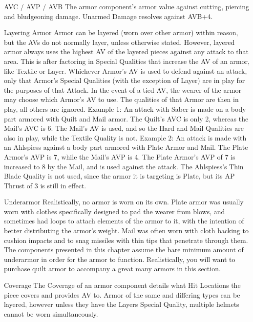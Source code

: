 \documentclass[oneside,11pt,english]{book}
\begin{document}
AVC / AVP / AVB 
The armor component’s armor value against cutting, piercing and bludgeoning damage. Unarmed 
Damage resolves against AVB+4. 

 


Layering Armor 
Armor can be layered (worn over other armor) within reason, but the AVs do not normally layer, unless 
otherwise stated. However, layered armor always uses the highest AV of the layered pieces against any 
attack to that area. This is after factoring in Special Qualities that increase the AV of an armor, like 
Textile or Layer. 
Whichever Armor’s AV is used to defend against an attack, only that Armor’s Special Qualities (with the 
exception of Layer) are in play for the purposes of that Attack. In the event of a tied AV, the wearer of the 
armor may choose which Armor’s AV to use. The qualities of that Armor are then in play, all others are 
ignored. 
Example 1: An attack with Saber is made on a body part armored with Quilt and Mail armor. The Quilt’s 
AVC is only 2, whereas the Mail’s AVC is 6. The Mail’s AV is used, and so the Hard and Mail Qualities 
are also in play, while the Textile Quality is not. 
Example 2: An attack is made with an Ahlspiess against a body part armored with Plate Armor and Mail. 
The Plate Armor’s AVP is 7, while the Mail’s AVP is 4. The Plate Armor’s AVP of 7 is increased to 8 by 
the Mail, and is used against the attack. The Ahlspiess’s Thin Blade Quality is not used, since the armor it 
is targeting is Plate, but its AP Thrust of 3 is still in effect. 

 

Underarmor 
Realistically, no armor is worn on its own. Plate armor was usually worn with clothes specifically 
designed to pad the wearer from blows, and sometimes had loops to attach elements of the armor to it, 
with the intention of better distributing the armor’s weight. Mail was often worn with cloth backing to 
cushion impacts and to snag missiles with thin tips that penetrate through them. 
The components presented in this chapter assume the bare minimum amount of underarmor in order for 
the armor to function. Realistically, you will want to purchase quilt armor to accompany a great many 
armors in this section. 

 

Coverage 
The Coverage of an armor component details what Hit Locations the piece covers and provides AV to. 
Armor of the same and differing types can be layered, however unless they have the Layers Special 
Quality, multiple helmets cannot be worn simultaneously. 
\end{document}
